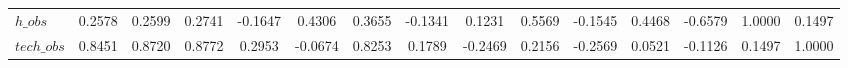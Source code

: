 \begin{center}
\begin{longtable}{lcccccccccccccc}
$h\_obs         $	 & 	           0.2578	 & 	           0.2599	 & 	           0.2741	 & 	          -0.1647	 & 	           0.4306	 & 	           0.3655	 & 	          -0.1341	 & 	           0.1231	 & 	           0.5569	 & 	          -0.1545	 & 	           0.4468	 & 	          -0.6579	 & 	           1.0000	 & 	           0.1497 \\ 
$tech\_obs      $	 & 	           0.8451	 & 	           0.8720	 & 	           0.8772	 & 	           0.2953	 & 	          -0.0674	 & 	           0.8253	 & 	           0.1789	 & 	          -0.2469	 & 	           0.2156	 & 	          -0.2569	 & 	           0.0521	 & 	          -0.1126	 & 	           0.1497	 & 	           1.0000 \\ 
\end{longtable}
 \end{center}
